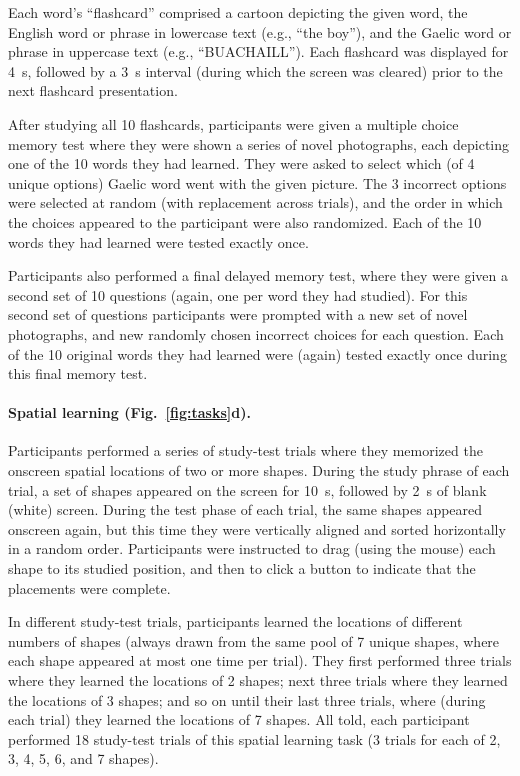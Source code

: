 \documentclass[10pt]{article}
\begin{document}
Each word's ``flashcard'' comprised a cartoon depicting the given
word, the English word or phrase in lowercase text (e.g., ``the
boy''), and the Gaelic word or phrase in uppercase text (e.g.,
``BUACHAILL'').  Each flashcard was displayed for 4~s, followed by a
3~s interval (during which the screen was cleared) prior to the next
flashcard presentation.

After studying all 10 flashcards, participants were given a multiple
choice memory test where they were shown a series of novel
photographs, each depicting one of the 10 words they had learned.
They were asked to select which (of 4 unique options) Gaelic word went
with the given picture.  The 3 incorrect options were selected at
random (with replacement across trials), and the order in which the
choices appeared to the participant were also randomized.  Each of the
10 words they had learned were tested exactly once.

Participants also performed a final delayed memory test, where they
were given a second set of 10 questions (again, one per word they had
studied).  For this second set of questions participants were prompted
with a new set of novel photographs, and new randomly chosen incorrect
choices for each question.  Each of the 10 original words they had
learned were (again) tested exactly once during this final memory
test.



\paragraph*{Spatial learning (Fig.~\ref{fig:tasks}d).}
Participants performed a series of study-test trials where they
memorized the onscreen spatial locations of two or more shapes.
During the study phrase of each trial, a set of shapes appeared on the
screen for 10~s, followed by 2~s of blank (white) screen.  During the
test phase of each trial, the same shapes appeared onscreen again, but
this time they were vertically aligned and sorted horizontally in a
random order.  Participants were instructed to drag (using the mouse)
each shape to its studied position, and then to click a button to
indicate that the placements were complete.

In different study-test trials, participants learned the locations of
different numbers of shapes (always drawn from the same pool of 7
unique shapes, where each shape appeared at most one time per trial).
They first performed three trials where they learned the locations of
2 shapes; next three trials where they learned the locations of 3
shapes; and so on until their last three trials, where (during each
trial) they learned the locations of 7 shapes.  All told, each
participant performed 18 study-test trials of this spatial learning
task (3 trials for each of 2, 3, 4, 5, 6, and 7 shapes).
\end{document}
